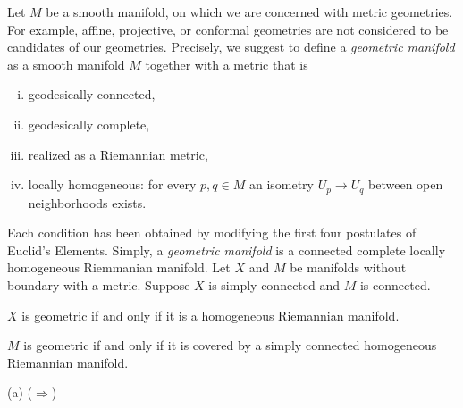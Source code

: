 \documentclass{../../large}
\begin{document}
\begin{prb}
Let $M$ be a smooth manifold, on which we are concerned with metric geometries.
For example, affine, projective, or conformal geometries are not considered to be candidates of our geometries.
Precisely, we suggest to define a \emph{geometric manifold} as a smooth manifold $M$ together with a metric that is
\begin{enumerate}[(i)]
\item geodesically connected,
\item geodesically complete,
\item realized as a Riemannian metric,
\item locally homogeneous: for every $p,q\in M$ an isometry $U_p\to U_q$ between open neighborhoods exists.
\end{enumerate}
Each condition has been obtained by modifying the first four postulates of Euclid's Elements.
Simply, a \emph{geometric manifold} is a connected complete locally homogeneous Riemmanian manifold.
Let $X$ and $M$ be manifolds without boundary with a metric.
Suppose $X$ is simply connected and $M$ is connected.
\begin{parts}
\item $X$ is geometric if and only if it is a homogeneous Riemannian manifold.
\item $M$ is geometric if and only if it is covered by a simply connected homogeneous Riemannian manifold.
\end{parts}
\end{prb}
\begin{pf}
(a)
($\Rightarrow$)


\end{pf}
\end{document}

